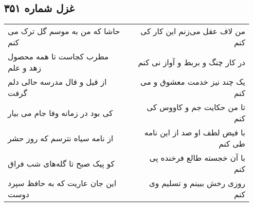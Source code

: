 \begin{center}
\section*{غزل شماره ۳۵۱}
\label{sec:sh351}
\begin{longtable}{l p{0.5cm} r}
حاشا که من به موسم گل ترک می کنم
&&
من لاف عقل می‌زنم این کار کی کنم
\\
مطرب کجاست تا همه محصول زهد و علم
&&
در کار چنگ و بربط و آواز نی کنم
\\
از قیل و قال مدرسه حالی دلم گرفت
&&
یک چند نیز خدمت معشوق و می کنم
\\
کی بود در زمانه وفا جام می بیار
&&
تا من حکایت جم و کاووس کی کنم
\\
از نامه سیاه نترسم که روز حشر
&&
با فیض لطف او صد از این نامه طی کنم
\\
کو پیک صبح تا گله‌های شب فراق
&&
با آن خجسته طالع فرخنده پی کنم
\\
این جان عاریت که به حافظ سپرد دوست
&&
روزی رخش ببینم و تسلیم وی کنم
\\
\end{longtable}
\end{center}
